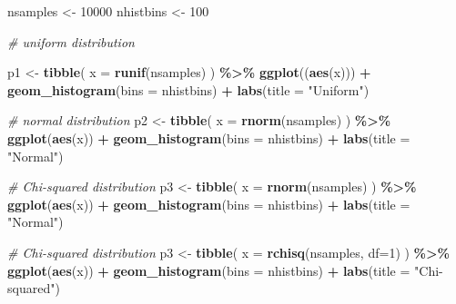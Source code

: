 \documentclass[
  12pt,
]{book}
\newenvironment{Shaded}{\begin{snugshade}}{\end{snugshade}}
\newcommand{\AttributeTok}[1]{\textcolor[rgb]{0.13,0.29,0.53}{#1}}
\newcommand{\CommentTok}[1]{\textcolor[rgb]{0.56,0.35,0.01}{\textit{#1}}}
\newcommand{\DecValTok}[1]{\textcolor[rgb]{0.00,0.00,0.81}{#1}}
\newcommand{\FunctionTok}[1]{\textcolor[rgb]{0.13,0.29,0.53}{\textbf{#1}}}
\newcommand{\NormalTok}[1]{#1}
\newcommand{\OtherTok}[1]{\textcolor[rgb]{0.56,0.35,0.01}{#1}}
\newcommand{\SpecialCharTok}[1]{\textcolor[rgb]{0.81,0.36,0.00}{\textbf{#1}}}
\newcommand{\StringTok}[1]{\textcolor[rgb]{0.31,0.60,0.02}{#1}}
\begin{document}
\begin{Shaded}
\begin{Highlighting}[]
\NormalTok{nsamples }\OtherTok{\textless{}{-}} \DecValTok{10000}
\NormalTok{nhistbins }\OtherTok{\textless{}{-}} \DecValTok{100}

\CommentTok{\# uniform distribution}

\NormalTok{p1 }\OtherTok{\textless{}{-}}
  \FunctionTok{tibble}\NormalTok{(}
    \AttributeTok{x =} \FunctionTok{runif}\NormalTok{(nsamples)}
\NormalTok{  ) }\SpecialCharTok{\%\textgreater{}\%} 
  \FunctionTok{ggplot}\NormalTok{((}\FunctionTok{aes}\NormalTok{(x))) }\SpecialCharTok{+}
  \FunctionTok{geom\_histogram}\NormalTok{(}\AttributeTok{bins =}\NormalTok{ nhistbins) }\SpecialCharTok{+} 
  \FunctionTok{labs}\NormalTok{(}\AttributeTok{title =} \StringTok{"Uniform"}\NormalTok{)}

\CommentTok{\# normal distribution}
\NormalTok{p2 }\OtherTok{\textless{}{-}}
  \FunctionTok{tibble}\NormalTok{(}
    \AttributeTok{x =} \FunctionTok{rnorm}\NormalTok{(nsamples)}
\NormalTok{  ) }\SpecialCharTok{\%\textgreater{}\%} 
  \FunctionTok{ggplot}\NormalTok{(}\FunctionTok{aes}\NormalTok{(x)) }\SpecialCharTok{+}
  \FunctionTok{geom\_histogram}\NormalTok{(}\AttributeTok{bins =}\NormalTok{ nhistbins) }\SpecialCharTok{+}
  \FunctionTok{labs}\NormalTok{(}\AttributeTok{title =} \StringTok{"Normal"}\NormalTok{)}

\CommentTok{\# Chi{-}squared distribution}
\NormalTok{p3 }\OtherTok{\textless{}{-}}
  \FunctionTok{tibble}\NormalTok{(}
    \AttributeTok{x =} \FunctionTok{rnorm}\NormalTok{(nsamples)}
\NormalTok{  ) }\SpecialCharTok{\%\textgreater{}\%} 
  \FunctionTok{ggplot}\NormalTok{(}\FunctionTok{aes}\NormalTok{(x)) }\SpecialCharTok{+}
  \FunctionTok{geom\_histogram}\NormalTok{(}\AttributeTok{bins =}\NormalTok{ nhistbins) }\SpecialCharTok{+}
  \FunctionTok{labs}\NormalTok{(}\AttributeTok{title =} \StringTok{"Normal"}\NormalTok{)}

\CommentTok{\# Chi{-}squared distribution}
\NormalTok{p3 }\OtherTok{\textless{}{-}}
  \FunctionTok{tibble}\NormalTok{(}
    \AttributeTok{x =} \FunctionTok{rchisq}\NormalTok{(nsamples, }\AttributeTok{df=}\DecValTok{1}\NormalTok{)}
\NormalTok{  ) }\SpecialCharTok{\%\textgreater{}\%} 
  \FunctionTok{ggplot}\NormalTok{(}\FunctionTok{aes}\NormalTok{(x)) }\SpecialCharTok{+}
  \FunctionTok{geom\_histogram}\NormalTok{(}\AttributeTok{bins =}\NormalTok{ nhistbins) }\SpecialCharTok{+}
  \FunctionTok{labs}\NormalTok{(}\AttributeTok{title =} \StringTok{"Chi{-}squared"}\NormalTok{)}


\end{Highlighting}
\end{Shaded}
\end{document}
